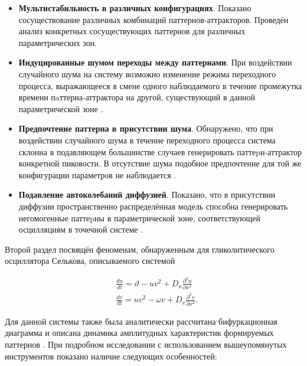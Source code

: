 \begin{itemize}
    \item \textbf{Мультистабильность в различных конфигурациях}. Показано сосуществование различных комбинаций паттернов-аттракторов. Проведён анализ конкретных сосуществующих паттернов для различных параметрических зон.
    \item \textbf{Индуцированные шумом переходы между паттернами}. При воздействии случайного шума на систему возможно изменение режима переходного процесса, выражающееся в смене одного наблюдаемого в течение промежутка времени пaттерна-аттрактора на другой, существующий в данной параметрической зоне \cite{bib1}.
    \item \textbf{Предпочтение паттерна в присутствии шума}. Обнаружено, что при воздействии случайного шума в течение переходного процесса система склонна в подавляющем большинстве случаев генерировать паттеpн-аттрактор конкретной пиковости. В отсутствие шума подобное предпочтение для той же конфигурации параметров не наблюдается \cite{bib1}.
    \item \textbf{Подавление автоколебаний диффузией}. Показано, что в присутствии диффузии пространственно распределённая модель способна генерировать негомогенные паттеpны в параметрической зоне, соответствующей осцилляциям в точечной системе \cite{bib2}.
\end{itemize}

Второй раздел посвящён феноменам, обнаруженным для гликолитического осциллятора Селькова, описываемого системой

\begin{equation}
    \begin{aligned}
        & \frac{d u}{d t}=\vartheta-u v^2+D_u \frac{\partial^2 u}{\partial x^2} \\
        & \frac{d v}{d t}=u v^2-\omega v+D_v \frac{\partial^2 v}{\partial x^2}.
        \end{aligned}
\end{equation}

Для данной системы также была аналитически рассчитана бифуркационная диаграмма и описана динамика амплитудных характеристик формируемых паттернов \cite{bib3}. При подробном исследовании с использованием вышеупомянутых инструментов показано наличие следующих особенностей:

